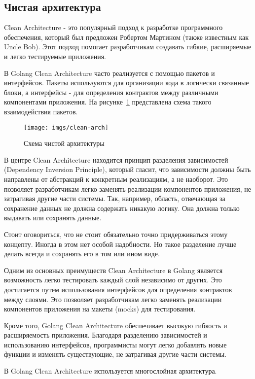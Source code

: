 \subsection{Чистая архитектура} \label{clean-arch}
Clean Architecture - это популярный подход к разработке программного обеспечения, 
который был предложен Робертом Мартином (также известным как Uncle Bob). 
Этот подход помогает разработчикам создавать гибкие, расширяемые и легко тестируемые приложения.

В Golang Clean Architecture часто реализуется с помощью пакетов и интерфейсов. 
Пакеты используются для организации кода в логически связанные блоки, 
а интерфейсы - для определения контрактов между различными компонентами приложения.
На рисунке~\ref{clean-arch-pic} представлена схема такого взаимодействия пакетов.

\begin{figure}
    \texttt{[image: imgs/clean-arch]}
    \caption{Схема чистой архитектуры}
    \label{clean-arch-pic}
\end{figure}

В центре Clean Architecture находится принцип разделения зависимостей (Dependency Inversion Principle), который гласит, что зависимости должны быть направлены от абстракций к конкретным реализациям, а не наоборот.
Это позволяет разработчикам легко заменять реализации компонентов приложения, не затрагивая другие части системы.
Так, например, область, отвечающая за сохранение данных не должна содержать никакую логику.
Она должна только выдавать или сохранять данные.

Стоит оговориться, что не стоит обязательно точно придерживаться этому концепту.
Иногда в этом нет особой надобности.
Но такое разделение лучше делать всегда и сохранять его в том или ином виде.

Одним из основных преимуществ Clean Architecture в Golang является возможность легко тестировать каждый слой независимо от других. 
Это достигается путем использования интерфейсов для определения контрактов между слоями. 
Это позволяет разработчикам легко заменять реализации компонентов приложения на макеты (mocks) для тестирования.

Кроме того, Golang Clean Architecture обеспечивает высокую гибкость и расширяемость приложения. 
Благодаря разделению зависимостей и использованию интерфейсов, программисты могут легко добавлять новые функции и изменять существующие, не затрагивая другие части системы.

В Golang Clean Architecture используется многослойная архитектура.


